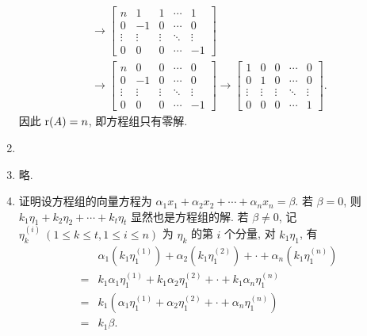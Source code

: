 \begin{enumerate}
\begin{gather*}
            \rightarrow
            \begin{bmatrix}
                n & 1 & 1 & \cdots & 1 \\
                0 & -1 & 0 & \cdots & 0 \\
                \vdots & \vdots & \vdots & \ddots & \vdots \\
                0 & 0 & 0 & \cdots & -1
            \end{bmatrix} \\
            \rightarrow
            \begin{bmatrix}
                n & 0 & 0 & \cdots & 0 \\
                0 & -1 & 0 & \cdots & 0 \\
                \vdots & \vdots & \vdots & \ddots & \vdots \\
                0 & 0 & 0 & \cdots & -1
            \end{bmatrix}
            \rightarrow
            \begin{bmatrix}
                1 & 0 & 0 & \cdots & 0 \\
                0 & 1 & 0 & \cdots & 0 \\
                \vdots & \vdots & \vdots & \ddots & \vdots \\
                0 & 0 & 0 & \cdots & 1
            \end{bmatrix}.
        \end{gather*}
        因此 $\mathrm{r}(A) = n$, 即方程组只有零解.
    \item %
    \item %
        略.
    \item %
        {\heiti 证明}\quad 设方程组的向量方程为 $\alpha_1x_1 + \alpha_2x_2 + \cdots + \alpha_nx_n = \beta$.
        若 $\beta = 0$, 则 $k_1\eta_1 + k_2\eta_2 + \cdots + k_t\eta_t$ 显然也是方程组的解.
        若 $\beta \neq 0$, 记 $\eta_k^{(i)}\ (1 \leqslant k \leqslant t, 1\leqslant i\leqslant n)$ 为 $\eta_k$ 的第 $i$ 个分量, 对 $k_1\eta_1$, 有
        \begin{align*}
            & \alpha_1(k_1\eta_1^{(1)}) + \alpha_2(k_1\eta_1^{(2)}) + \cdot + \alpha_n(k_1\eta_1^{(n)}) \\
            ={} & k_1\alpha_1\eta_1^{(1)} + k_1\alpha_2\eta_1^{(2)} + \cdot + k_1\alpha_n\eta_1^{(n)} \\
            ={} & k_1(\alpha_1\eta_1^{(1)} + \alpha_2\eta_1^{(2)} + \cdot + \alpha_n\eta_1^{(n)}) \\
            ={} & k_1\beta.    
        \end{align*}

\end{enumerate}
